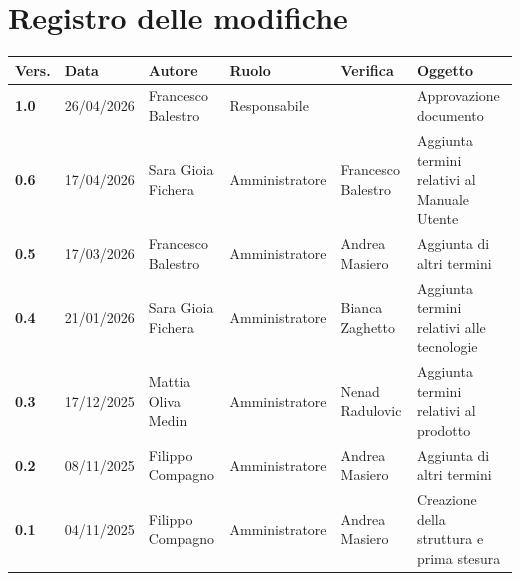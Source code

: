 \documentclass[a4paper,12pt]{article}
\begin{document}
    

        \newpage
        \section*{Registro delle modifiche} {
        \begin{table}[h!]
            \begin{tabularx}{\textwidth}{|l|l|l|l|L|L|}
                \hline
                \textbf{Vers.} & \textbf{Data} & \textbf{Autore} & \textbf{Ruolo} & \textbf{Verifica} & \textbf{Oggetto} \\
                \hline
                \textbf{1.0} & 26/04/2026 & Francesco Balestro & Responsabile &  & Approvazione documento\\
                \hline
                \textbf{0.6} & 17/04/2026 & Sara Gioia Fichera & Amministratore & Francesco Balestro & Aggiunta termini relativi al Manuale Utente\\
                \hline
                \textbf{0.5} & 17/03/2026 & Francesco Balestro & Amministratore & Andrea Masiero & Aggiunta di altri termini \\
                \hline
                \textbf{0.4} & 21/01/2026 & Sara Gioia Fichera & Amministratore & Bianca Zaghetto & Aggiunta termini relativi alle tecnologie \\
                \hline
                \textbf{0.3} & 17/12/2025 & Mattia Oliva Medin & Amministratore & Nenad Radulovic & Aggiunta termini relativi al prodotto \\
                \hline
                \textbf{0.2} & 08/11/2025 & Filippo Compagno & Amministratore & Andrea Masiero & Aggiunta di altri termini \\
                \hline
                \textbf{0.1} & 04/11/2025 & Filippo Compagno & Amministratore & Andrea Masiero & Creazione della struttura e prima stesura \\
                \hline
            \end{tabularx}
            \end{table}
        }
        \newpage

        \tableofcontents
        \newpage
\end{document}
